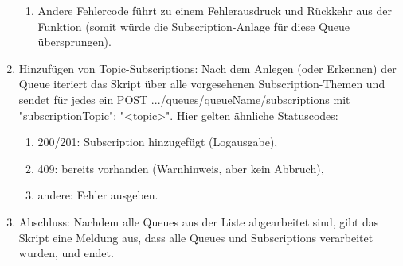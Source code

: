 \begin{enumerate}
\begin{enumerate}
        \item Andere Fehlercode führt zu einem Fehlerausdruck und Rückkehr aus der Funktion (somit würde die Subscription-Anlage für diese Queue übersprungen).
    \end{enumerate}
    \item Hinzufügen von Topic-Subscriptions: Nach dem Anlegen (oder Erkennen) der Queue iteriert das Skript über alle vorgesehenen Subscription-Themen und sendet für jedes ein POST .../queues/{queueName}/subscriptions mit {"subscriptionTopic": "<topic>"}. Hier gelten ähnliche Statuscodes:
    \begin{enumerate}
        \item 200/201: Subscription hinzugefügt (Logausgabe),
        \item 409: bereits vorhanden (Warnhinweis, aber kein Abbruch),
        \item andere: Fehler ausgeben.
    \end{enumerate}
    \item Abschluss: Nachdem alle Queues aus der Liste abgearbeitet sind, gibt das Skript eine Meldung aus, dass alle Queues und Subscriptions verarbeitet wurden, und endet.
\end{enumerate}
